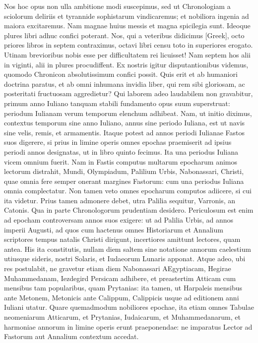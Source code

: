 Nos hoc opus non ulla ambitione
modi suscepimus, sed ut Chronologiam a sciolorum deliriis et tyrannide
sophistarum vindicaremus; et nobiliora ingenia ad maiora excitaremus.
Nam magnae huius messis et magna spicilegia sunt.
Ideoque
plures libri adhuc confici poterant.
Nos, qui a veteribus didicimus
\textgreek{[Greek]}, octo priores libros in septem contraximus,
octavi libri censu toto in superiores erogato.
Utinam brevioribus nobis esse per difficultatem rei licuisset!
Nam septem hos alii
in viginti, alii in plures procudiffent.
Ex nostris igitur disputantionibus
videmus, quomodo Chronicon absolutissimum confici possit.
Quis
erit et ab humaniori doctrina paratus, et ab omni inhumana invidia
liber, qui rem sibi gloriosam, ac posteritati fructuosam aggredietur?
Qui laborem adeo laudabilem non gravabitur, primum anno Iuliano
tanquam stabili fundamento opus suum superstruat: periodum Iulianam
verum temporum elenchum adhibeat.
Nam, ut initio diximus,
contextus temporum sine anno Iuliano, annus sine periodo Iuliana,
est ut navis sine velis, remis, et armamentis.
Itaque potest ad
annos periodi Iulianae Fastos suos digerere, si prius in limine operis
omnes epochas praemiserit ad ipsius periodi annos designatas, ut in
libro quinto fecimus.
Ita una periodus Iuliana vicem omnium fuerit.
Nam in Fastis computus multarum epocharum animos lectorum distrahit,
Mundi, Olympiadum, Palilium Urbis, Nabonassari, Christi,
quae omnia fere semper onerant margines Fastorum: cum una periodus
Iuliana omnia complectatur.
Non tamen veto omnes epocharum
computos adiicere, si cui ita videtur.
Prius tamen admonere debet,
utra Palilia sequitur, Varronis, an Catonis.
Qua in parte Chronologorum
prudentiam desidero.
Periculosum est enim ad epocham
controversam annos suos exigere: ut ad Palilia Urbis, ad annos imperii
Augusti, ad quos cum hactenus omnes Historiarum et Annalium
scriptores tempus natalis Christi dirigunt, incertiores amittunt
lectores, quam antea.
His ita constitutis, nullam diem saltem sine
notatione annorum caelestium utiusque sideris, nostri Solaris, et Iudaeorum
Lunaris apponat.
Atque adeo, ubi res postulabit, ne gravetur
etiam diem Nabonassari AEgyptiacam, Hegirae Muhammedanam,
Iezdegird Persicam adhibere, et preastertim Atticam cum mensibus
tam popularibus, quam Prytanias: ita tamen, ut Harpaleis mensibus
ante Metonem, Metonicis ante Calippum, Calippicis usque ad
editionem anni Iuliani utatur.
Quare quemadmodum nobiliores epochae,
ita etiam omnes Tabulae neomeniarum Atticarum, et Prytanias,
Iudaicarum, et Muhammedanarum, et harmoniae annorum
in limine operis erunt praeponendae: ne imparatus Lector ad Fastorum
aut Annalium contextum accedat.

